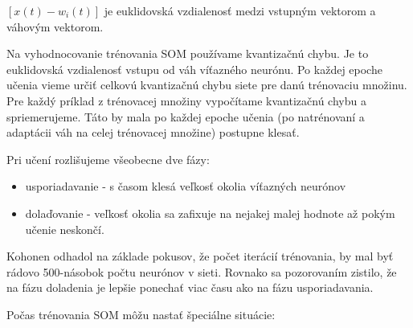 $[x(t) - w_i(t)]$ je euklidovská vzdialenosť medzi vstupným vektorom a váhovým vektorom.

Na vyhodnocovanie trénovania SOM používame kvantizačnú chybu. Je to euklidovská vzdialenosť vstupu
od váh víťazného neurónu. 
Po každej epoche učenia vieme určiť celkovú kvantizačnú chybu siete pre danú trénovaciu množinu.
Pre každý príklad z trénovacej množiny vypočítame kvantizačnú chybu a spriemerujeme. %
 Táto by mala po každej epoche učenia (po natrénovaní a adaptácii váh na celej trénovacej množine) postupne klesať.

Pri učení rozlišujeme všeobecne dve fázy:
\begin{itemize}
	\item usporiadavanie - s časom klesá veľkosť okolia víťazných neurónov 
	\item dolaďovanie - veľkosť okolia sa zafixuje na nejakej malej hodnote až pokým učenie neskončí.
\end{itemize}

Kohonen odhadol na základe pokusov, že počet iterácií trénovania, by mal byť rádovo 500-násobok počtu neurónov v sieti.
Rovnako sa pozorovaním zistilo, že na fázu doladenia je lepšie ponechať viac času ako na fázu usporiadavania.

Počas trénovania SOM môžu nastať špeciálne situácie:

